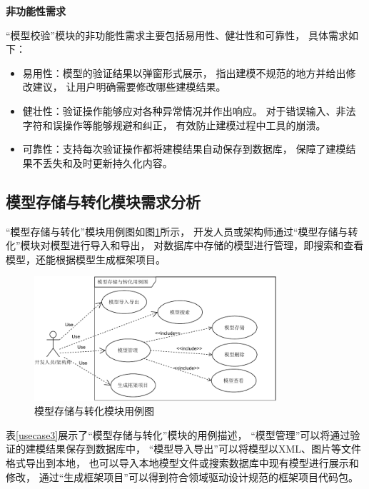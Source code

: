 \textbf{非功能性需求}

“模型校验”模块的非功能性需求主要包括易用性、健壮性和可靠性，
具体需求如下：

\begin{itemize}
    \item 易用性：模型的验证结果以弹窗形式展示，
    指出建模不规范的地方并给出修改建议，
    让用户明确需要修改哪些建模结果。

    \item 健壮性：验证操作能够应对各种异常情况并作出响应。
    对于错误输入、非法字符和误操作等能够规避和纠正，
    有效防止建模过程中工具的崩溃。
   
     \item 可靠性：支持每次验证操作都将建模结果自动保存到数据库，
    保障了建模结果不丢失和及时更新持久化内容。
\end{itemize}

\subsection{模型存储与转化模块需求分析}

“模型存储与转化”模块用例图如图\ref{us3}所示，
开发人员或架构师通过“模型存储与转化”模块对模型进行导入和导出，
对数据库中存储的模型进行管理，即搜索和查看模型，还能根据模型生成框架项目。

\begin{figure}[h] %
    \centering %
    \includegraphics[width=0.8\textwidth]{FIGs/chapter4/us3.pdf} %
    \caption{模型存储与转化模块用例图} %
    \label{us3} %
\end{figure}%

表\ref{usecase3}展示了“模型存储与转化”模块的用例描述，
“模型管理”可以将通过验证的建模结果保存到数据库中，
“模型导入导出”可以将模型以XML、图片等文件格式导出到本地，
也可以导入本地模型文件或搜索数据库中现有模型进行展示和修改，
通过“生成框架项目”可以得到符合领域驱动设计规范的框架项目代码包。

